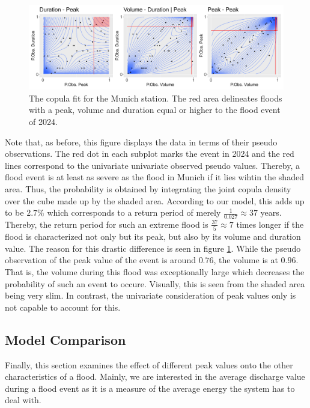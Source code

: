 \documentclass[
]{krantz}
\begin{document}
\begin{figure}

{\centering \includegraphics[width=0.7\linewidth]{work/04-floodfreq/figures/app_multivariate_hq} 

}

\caption{The copula fit for the Munich station. The red area delineates floods with a peak, volume and duration equal or higher to the flood event of 2024.}\label{fig:probMulti}
\end{figure}

Note that, as before, this figure displays the data in terms of their pseudo observations.
The red dot in each subplot marks the event in 2024 and the red lines correspond to the univariate
univariate observed pseudo values.
Thereby, a flood event is at least as severe as the flood in Munich if it lies wihtin the shaded area.
Thus, the probability is obtained by integrating the joint copula density over the cube made
up by the shaded area.
According to our model, this adds up to be \(2.7\%\) which corresponds to a return period of merely \(\frac{1}{0.027} \approx 37\) years.
Thereby, the return period for such an extreme flood is \(\frac{37}{5}\approx7\) times longer
if the flood is characterized not only but its peak, but also by its volume and duration value.
The reason for this drastic difference is
seen in figure \ref{fig:probMulti}. While the pseudo observation
of the peak value of the event is around \(0.76\),
the volume is at \(0.96\). That is, the volume during this flood was exceptionally large which
decreases the
probability of such an event to occure.
Visually, this is seen from the shaded area being very slim.
In contrast, the univariate consideration of
peak values only
is not capable to account for this.

\subsection{Model Comparison}\label{model-comparison}

Finally, this section examines the effect of different peak values onto the other characteristics of a flood.
Mainly, we are interested in the average discharge value during a flood event as it is a measure
of the average energy the system has to deal with.
\end{document}
